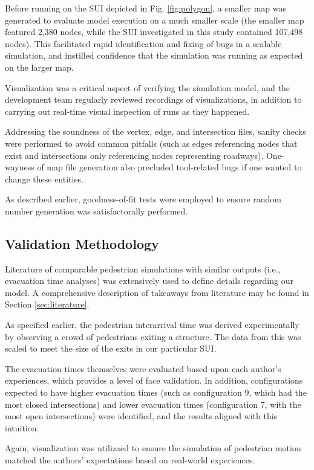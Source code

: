 \documentclass[12pt]{article}
\begin{document}
Before running on the SUI depicted in Fig. \ref{fig:polygon}, a smaller map
was generated to evaluate model execution on a much smaller scale (the smaller
map featured 2,380 nodes, while the SUI investigated in this study contained
107,498 nodes). This facilitated rapid identification and fixing of bugs in
a scalable simulation, and instilled confidence that the simulation was running
as expected on the larger map.

Visualization was a critical aspect of verifying the simulation model, and
the development team regularly reviewed recordings of visualizations, in
addition to carrying out real-time visual inspection of runs as they happened.

Addressing the soundness of the vertex, edge, and intersection files, sanity
checks were performed to avoid common pitfalls (such as edges referencing
nodes that exist and intersections only referencing nodes representing
roadways). One-wayness of map file generation also precluded tool-related
bugs if one wanted to change these entities.

As described earlier, goodness-of-fit tests were employed to ensure random
number generation was satisfactorally performed.

\subsection{Validation Methodology}
Literature of comparable pedestrian simulations with similar outputs (i.e.,
evacuation time analyses) was extensively used to define details regarding
our model. A comprehensive description of takeaways from literature may be
found in Section \ref{sec:literature}.

As specified earlier, the pedestrian interarrival time was derived
experimentally by observing a crowd of pedestrians exiting a structure. The
data from this was scaled to meet the size of the exits in our particular SUI.

The evacuation times themselves were evaluated based upon each author's
experiences, which provides a level of face validation. In addition,
configurations expected to have higher evacuation times (such as configuration
9, which had the most closed intersections) and lower evacuation times
(configuration 7, with the most open intersections) were identified, and the
results aligned with this intuition.

Again, visualization was utilizaed to ensure the simulation of pedestrian
motion matched the authors' expectations based on real-world experiences.
\end{document}
